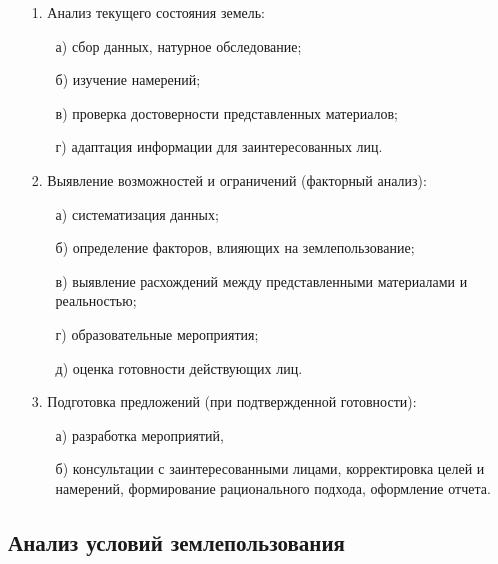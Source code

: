 \begin{enumerate}
    \item[1.] Анализ текущего состояния земель: 
    \begin{enumerate}
        \item[а)] сбор данных, натурное обследование; 
        \item[б)] изучение намерений;
        \item[в)] проверка достоверности представленных материалов;
        \item[г)] адаптация информации для заинтересованных лиц.
    \end{enumerate}
    \item[2.] Выявление возможностей и ограничений (факторный анализ):
    \begin{enumerate}
        \item[а)] систематизация данных;
        \item[б)] определение факторов, влияющих на землепользование; 
        \item[в)] выявление расхождений между представленными материалами и реальностью;
        \item[г)] образовательные мероприятия; 
        \item[д)] оценка готовности действующих лиц.
    \end{enumerate}
    \item[3.] Подготовка предложений (при подтвержденной готовности): 
    \begin{enumerate}
        \item[а)] разработка мероприятий, 
        \item[б)] консультации с заинтересованными лицами, корректировка целей и намерений, формирование рационального подхода, оформление отчета.
    \end{enumerate}
\end{enumerate}

\subsection{Анализ условий землепользования}
\label{subsec:zem}

